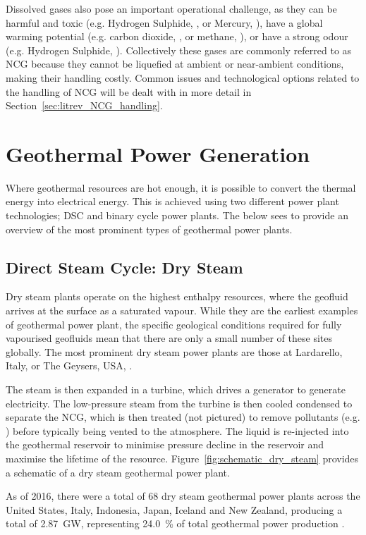         Dissolved gases also pose an important operational challenge, as they can be harmful and toxic (e.g. Hydrogen Sulphide, , or Mercury, ), have a global warming potential (e.g. carbon dioxide, , or methane, ), or have a strong odour (e.g. Hydrogen Sulphide, ). Collectively these gases are commonly referred to as \ac{NCG} because they cannot be liquefied at ambient or near-ambient conditions, making their handling costly. Common issues and technological options related to the handling of \ac{NCG} will be dealt with in more detail in Section~\ref{sec:litrev_NCG_handling}.
    
\section{Geothermal Power Generation}
\label{sec:geothermal_power}
    Where geothermal resources are hot enough, it is possible to convert the thermal energy into electrical energy. This is achieved using two different power plant technologies; \ac{DSC} and binary cycle power plants. The below sees to provide an overview of the most prominent types of geothermal power plants.

    \subsection{Direct Steam Cycle: Dry Steam}
    \label{sec:dry_steam}
        Dry steam plants operate on the highest enthalpy resources, where the geofluid arrives at the surface as a  saturated vapour. While they are the earliest examples of geothermal power plant, the specific geological conditions required for fully vapourised geofluids mean that there are only a small number of these sites globally. The most prominent dry steam power plants are those at Lardarello, Italy, or The Geysers, USA, \cite{DiPippo2016}.  
        
        The steam is then expanded in a turbine, which drives a generator to generate electricity. The low-pressure steam from the turbine is then cooled condensed to separate the \ac{NCG}, which is then treated (not pictured) to remove pollutants (e.g. ) before typically being vented to the atmosphere. The liquid is re-injected into the geothermal reservoir to minimise pressure decline in the reservoir and maximise the lifetime of the resource. Figure~\ref{fig:schematic_dry_steam} provides a schematic of a dry steam geothermal power plant.

        As of 2016, there were a total of \num{68} dry steam geothermal power plants across the United States, Italy, Indonesia, Japan, Iceland and New Zealand, producing a total of \qty{2.87}{\giga\watt}, representing \qty{24.0}{\percent} of total geothermal power production \cite{DiPippo2016}.

